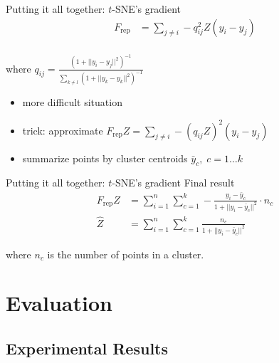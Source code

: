 \documentclass{beamer}
\begin{document}
\begin{frame}[fragile]{Putting it all together: $t$-SNE's gradient}
    \begin{align*}
        F_\text{rep} &= \sum_{j \neq i} -q_{ij}^2Z(y_i - y_j) \\
    \end{align*}

    \vspace{-1em}
    \quad where $q_{ij} = \frac{(1 + ||y_i - y_j||^2)^{-1}}{\sum_{k \neq l} (1 + ||y_k - y_k||^2)^{-1}}$

    \begin{itemize}
        \item more difficult situation
        \item trick: approximate $F_\text{rep}Z = \sum_{j \neq i} -(q_{ij}Z)^2(y_i - y_j)$
        \item summarize points by cluster centroids $\bar{y}_c, \; c = 1\ldots k$
    \end{itemize}
\end{frame}

\begin{frame}[fragile]{Putting it all together: $t$-SNE's gradient}
    \quad Final result
    \begin{align*}
        F_\text{rep}Z &= \sum_{i=1}^{n} \sum_{c=1}^{k} - \frac{y_i - \bar{y}_c}{1 + ||y_i - \bar{y}_c||^2} \cdot n_c \\
        \hat{Z} &= \sum_{i = 1}^{n} \sum_{c=1}^{k} \frac{n_c}{1 + ||y_i - \bar{y}_c||^2}
    \end{align*}

    \quad where $n_c$ is the number of points in a cluster.

\end{frame}

\section{Evaluation}

\subsection{Experimental Results}
\end{document}
